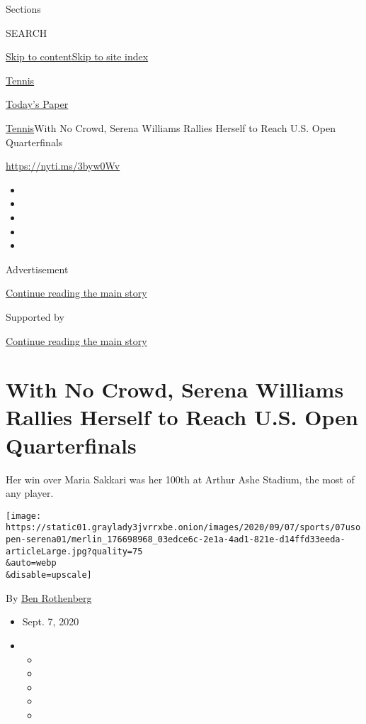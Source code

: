 Sections

SEARCH

\protect\hyperlink{site-content}{Skip to
content}\protect\hyperlink{site-index}{Skip to site index}

\href{https://www.nytimes3xbfgragh.onion/section/sports/tennis}{Tennis}

\href{https://myaccount.nytimes3xbfgragh.onion/auth/login?response_type=cookie\&client_id=vi}{}

\href{https://www.nytimes3xbfgragh.onion/section/todayspaper}{Today's
Paper}

\href{/section/sports/tennis}{Tennis}\textbar{}With No Crowd, Serena
Williams Rallies Herself to Reach U.S. Open Quarterfinals

\url{https://nyti.ms/3byw0Wv}

\begin{itemize}
\item
\item
\item
\item
\item
\end{itemize}

Advertisement

\protect\hyperlink{after-top}{Continue reading the main story}

Supported by

\protect\hyperlink{after-sponsor}{Continue reading the main story}

\hypertarget{with-no-crowd-serena-williams-rallies-herself-to-reach-us-open-quarterfinals}{%
\section{With No Crowd, Serena Williams Rallies Herself to Reach U.S.
Open
Quarterfinals}\label{with-no-crowd-serena-williams-rallies-herself-to-reach-us-open-quarterfinals}}

Her win over Maria Sakkari was her 100th at Arthur Ashe Stadium, the
most of any player.

\texttt{[image: https://static01.graylady3jvrrxbe.onion/images/2020/09/07/sports/07usopen-serena01/merlin\_176698968\_03edce6c-2e1a-4ad1-821e-d14ffd33eeda-articleLarge.jpg?quality=75\\\&auto=webp\\\&disable=upscale]}

By \href{https://www.nytimes3xbfgragh.onion/by/ben-rothenberg}{Ben
Rothenberg}

\begin{itemize}
\item
  Sept. 7, 2020
\item
  \begin{itemize}
  \item
  \item
  \item
  \item
  \item
  \end{itemize}
\end{itemize}

